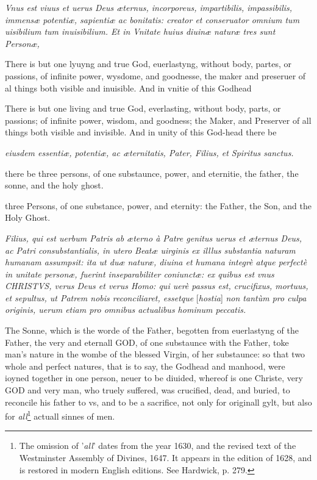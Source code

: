 
\emph{Vnus est viuus et uerus Deus æternus, incorporeus, impartibilis, impassibilis, immensæ potentiæ, sapientiæ ac bonitatis: creator et conseruator omnium tum uisibilium tum inuisibilium. Et in Vnitate huius diuinæ naturæ tres sunt Personæ, }

There is but one lyuyng and true God, euerlastyng, without body, partes, or passions, of infinite power, wysdome, and goodnesse, the maker and preseruer of al things both visible and inuisible. And in vnitie of this Godhead

There is but one living and true God, everlasting, without body, parts, or passions; of infinite power, wisdom, and goodness; the Maker, and Preserver of all things both visible and invisible. And in unity of this God-head there be

\emph{eiusdem essentiæ, potentiæ, ac æternitatis, Pater, Filius, et Spiritus sanctus.}

there be three persons, of one substaunce, power, and eternitie, the father, the sonne, and the holy ghost.

three Persons, of one substance, power, and eternity: the Father, the Son, and the Holy Ghost.


\emph{Filius, qui est uerbum Patris ab æterno à Patre genitus uerus et æternus Deus, ac Patri consubstantialis, in utero Beatæ uirginis ex illlus substantia naturam humanam assumpsit: ita ut duæ naturæ, diuina et humana integrè atque perfectè in unitate personæ, fuerint inseparabiliter coniunctæ: ex quibus est vnus CHRISTVS, verus Deus et verus Homo: qui uerè passus est, crucifixus, mortuus, et sepultus, ut Patrem nobis reconciliaret, essetque} [\emph{hostia}] \emph{non tantùm pro culpa originis, uerum etiam pro omnibus actualibus hominum peccatis.}

The Sonne, which is the worde of the Father, begotten from euerlastyng of the Father, the very and eternall GOD, of one substaunce with the Father, toke man's nature in the wombe of the blessed Virgin, of her substaunce: so that two whole and perfect natures, that is to say, the Godhead and manhood, were ioyned together in one person, neuer to be diuided, whereof is one Christe, very GOD and very man, who truely suffered, was crucified, dead, and buried, to reconcile his father to vs, and to be a sacrifice, not only for originall gylt, but also for \emph{all}\footnote{The omission of '\emph{all}' dates from the year 1630, and the revised text of the Westminster Assembly of Divines, 1647. It appears in the edition of 1628, and is restored in modern English editions. See Hardwick, p. 279.} actuall sinnes of men.

